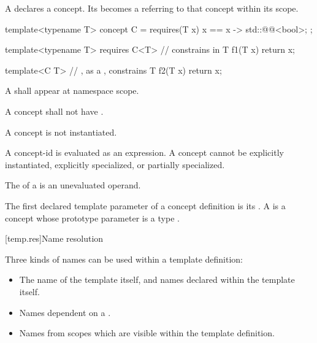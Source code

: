 \pnum
A 
declares a concept.
Its  becomes a 
referring to that concept
within its scope.
\begin{example}
\begin{codeblock}
template<typename T>
concept C = requires(T x) {
  { x == x } -> std::@@<bool>;
};

template<typename T>
  requires C<T>     //  constrains  in 
T f1(T x) { return x; }

template<C T>       // , as a , constrains 
T f2(T x) { return x; }
\end{codeblock}
\end{example}

\pnum
A 
shall appear at namespace scope.

\pnum
A concept shall not have .

\pnum
A concept is not instantiated.
\begin{note}
A concept-id is evaluated as an expression.
A concept cannot be
explicitly instantiated,
explicitly specialized,
or partially specialized.
\end{note}

\pnum
The  of a 
is an unevaluated operand.

\pnum
The first declared template parameter of a concept definition is its
.
%
A 
is a concept whose prototype parameter
is a type .

[temp.res]{Name resolution}

\pnum
{}%
%
Three kinds of names can be used within a template definition:

\begin{itemize}
\item
The name of the template itself,
and names declared within the template itself.
\item
Names dependent on a
.
\item
Names from scopes which are visible within the template definition.
\end{itemize}

